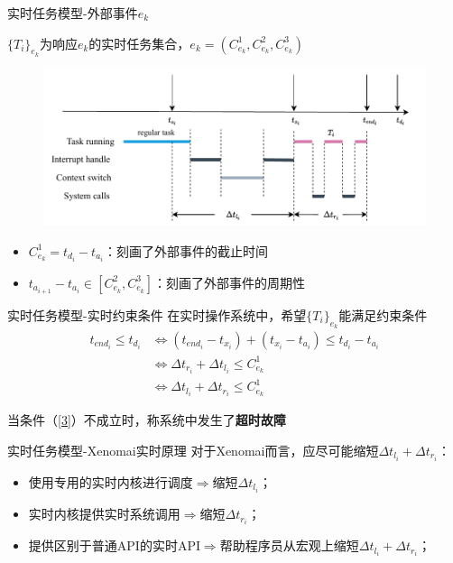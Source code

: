 \documentclass{beamer}
\begin{document}
\begin{frame}{实时任务模型-外部事件$e_k$}
    \begin{center}
        $\{T_i\}_{e_k}$为响应$e_k$的实时任务集合，$e_k=(C_{e_{k}}^1,C_{e_{k}}^2,C_{e_{k}}^3)$
    \end{center}
    \begin{figure}[h]
        \centering
        \includegraphics[height=.45\textheight]{img/Img/time-line.pdf}
    \end{figure}
    \begin{itemize}
        \item $C_{e_{k}}^1 = t_{d_i}-t_{a_i}$：刻画了外部事件的截止时间
        \item $t_{a_{i+1}}-t_{a_i}\in [C_{e_{k}}^2,C_{e_{k}}^3]$：刻画了外部事件的周期性
    \end{itemize}
\end{frame}

\begin{frame}{实时任务模型-实时约束条件}
    在实时操作系统中，希望$\{T_i\}_{e_k}$能满足约束条件
\begin{align}
    t_{end_i} \le t_{d_i} &\Leftrightarrow (t_{end_i} - t_{x_i}) + (t_{x_i} - t_{a_i}) \le t_{d_i} - t_{a_i} \\
    &\Leftrightarrow \Delta t_{r_i} + \Delta t_{l_i} \le C_{e_k}^1 \\
    &\Leftrightarrow \Delta t_{l_i} + \Delta t_{r_i} \le C_{e_k}^1\label{3}
\end{align}

当条件（\ref{3}）不成立时，称系统中发生了\textbf{超时故障}
    
\end{frame}

\begin{frame}{实时任务模型-Xenomai实时原理}
    对于Xenomai而言，应尽可能缩短$\Delta t_{l_i} + \Delta t_{r_i}$：
    \begin{itemize}
        \item 使用专用的实时内核进行调度$\Rightarrow$缩短$\Delta t_{l_i}$；
        \item 实时内核提供实时系统调用$\Rightarrow$缩短$\Delta t_{r_i}$；
        \item 提供区别于普通API的实时API$\Rightarrow$帮助程序员从宏观上缩短$\Delta t_{l_i} + \Delta t_{r_i}$；
    \end{itemize}
\end{frame}
\end{document}
